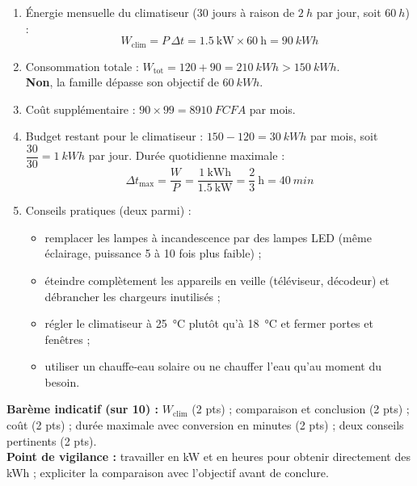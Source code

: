 \documentclass[11pt]{article}
\begin{document}
\begin{corrige}
\begin{enumerate}
\item Énergie mensuelle du climatiseur (30 jours à raison de $\SI{2}{h}$ par jour, soit $\SI{60}{h}$) :
\[
W_{\text{clim}} = P\,\Delta t = \num{1,5}\ \text{kW} \times 60\ \text{h} = \SI{90}{kWh}
\]
\item Consommation totale : $W_{\text{tot}} = 120 + 90 = \SI{210}{kWh} > \SI{150}{kWh}$.\\
\textbf{Non}, la famille dépasse son objectif de $\SI{60}{kWh}$.
\item Coût supplémentaire : $90 \times 99 = \SI{8910}{FCFA}$ par mois.
\item Budget restant pour le climatiseur : $150 - 120 = \SI{30}{kWh}$ par mois, soit $\dfrac{30}{30} = \SI{1}{kWh}$ par jour. Durée quotidienne maximale :
\[
\Delta t_{\max} = \frac{W}{P} = \frac{1\ \text{kWh}}{\num{1,5}\ \text{kW}} = \frac{2}{3}\ \text{h} = \SI{40}{min}
\]
\item Conseils pratiques (deux parmi) :
\begin{itemize}
\item remplacer les lampes à incandescence par des lampes LED (même éclairage, puissance 5 à 10 fois plus faible) ;
\item éteindre complètement les appareils en veille (téléviseur, décodeur) et débrancher les chargeurs inutilisés ;
\item régler le climatiseur à \SI{25}{\celsius} plutôt qu'à \SI{18}{\celsius} et fermer portes et fenêtres ;
\item utiliser un chauffe-eau solaire ou ne chauffer l'eau qu'au moment du besoin.
\end{itemize}
\end{enumerate}
\textbf{Barème indicatif (sur 10) :} $W_{\text{clim}}$ (2 pts) ; comparaison et conclusion (2 pts) ; coût (2 pts) ; durée maximale avec conversion en minutes (2 pts) ; deux conseils pertinents (2 pts).\\
\textbf{Point de vigilance :} travailler en kW et en heures pour obtenir directement des kWh ; expliciter la comparaison avec l'objectif avant de conclure.
\end{corrige}
\end{document}

